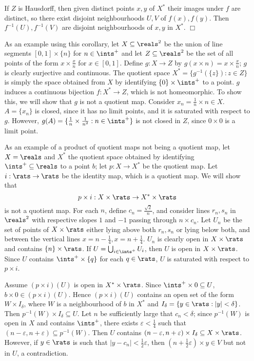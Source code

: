 If $Z$ is Hausdorff, then given distinct points $x, y$ of $X^*$ their images under $f$ are distinct, so there exist disjoint neighbourhoods $U, V$ of $f(x), f(y)$. Then $f^{-1}(U), f^{-1}(V)$ are disjoint neighbourhoods of $x, y$ in $X^*$. $\Box$

As an example using this corollary, let $X \subseteq \reals^2$ be the union of line segments $[0, 1] \times \{n\}$ for $n \in \ints^+$ and let $Z \subseteq \reals^2$ be the set of all points of the form $x \times \frac{x}{n}$ for $x \in [0, 1]$. Define $g: X \rightarrow Z$ by $g(x \times n) = x \times \frac{x}{n}$; $g$ is clearly surjective and continuous. The quotient space $X^* = \{g^{-1}(\{z\}): z \in Z\}$ is simply the space obtained from $X$ by identifying $\{0 \}\times \ints^+$ to a point. $g$ induces a continuous bijection $f: X^* \rightarrow Z$, which is not homeomorphic. To show this, we will show that $g$ is not a quotient map. Consider $x_n = \frac1n \times n \in X$. $A = \{x_n\}$ is closed, since it has no limit points, and it is saturated with respect to $g$. However, $g(A) = \{\frac1n \times \frac{1}{n^2}: n \in \ints^+\}$ is not closed in $Z$, since $0 \times 0$ is a limit point.

As an example of a product of quotient maps not being a quotient map, let $X = \reals$ and $X^*$ the quotient space obtained by identifying $\ints^+ \subseteq \reals$ to a point $b$; let $p: X \rightarrow X^*$ be the quotient map. Let $i: \rats \rightarrow \rats$ be the identity map, which is a quotient map. We will show that
$$p \times i: X \times \rats \rightarrow X^* \times \rats$$
is not a quotient map. For each $n$, define $c_n = \frac{\sqrt2}{n}$, and consider lines $r_n, s_n$ in $\reals^2$ with respective slopes $1$ and $-1$ passing through $n \times c_n$. Let $U_n$ be the set of points of $X \times \rats$ either lying above both $r_n, s_n$ or lying below both, and between the vertical lines $x = n - \frac14, x = n+ \frac14$. $U_n$ is clearly open in $X \times \rats$ and contains $\{n\}\times \rats$. If $U = \bigcup_{i \in \ints^+} U_i$, then $U$ is open in $X \times \rats$. Since $U$ contains $\ints^+ \times \{q\}$ for each $q \in \rats$, $U$ is saturated with respect to $p \times i$. 

Assume $(p \times i)(U)$ is open in $X^* \times \rats$. Since $\ints^+ \times 0 \subseteq U$, $b \times 0 \in (p \times i)(U)$. Hence $(p \times i)(U)$ contains an open set of the form $W \times I_\delta$, where $W$ is a neighbourhood of $b$ in $X^*$ and $I_\delta = \{y \in \rats: |y| < \delta\}$. Then $p^{-1}(W) \times I_\delta \subseteq U$. Let $n$ be sufficiently large that $c_n < \delta$; since $p^{-1}(W)$ is open in $X$ and contains $\ints^+$, there exists $\varepsilon < \frac14$ such that $(n-\varepsilon, n+\varepsilon) \subseteq p^{-1}(W)$. Then $U$ contains $(n - \varepsilon, n + \varepsilon) \times I_\delta \subseteq X \times \rats$. However, if $y\in \rats$ is such that $|y-c_n| < \frac12 \varepsilon$, then $(n + \frac12 \varepsilon) \times y \in V$ but not in $U$, a contradiction.
